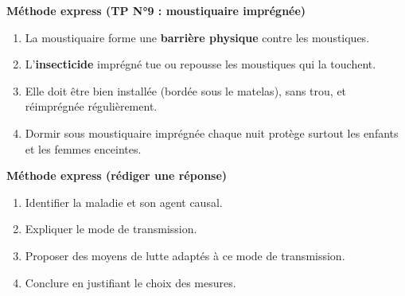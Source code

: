 \documentclass[11pt]{article}
\begin{document}
\begin{bilan}
\textbf{Méthode express (TP N°9 : moustiquaire imprégnée)}
\begin{enumerate}
  \item La moustiquaire forme une \textbf{barrière physique} contre les moustiques.
  \item L'\textbf{insecticide} imprégné tue ou repousse les moustiques qui la touchent.
  \item Elle doit être bien installée (bordée sous le matelas), sans trou, et réimprégnée régulièrement.
  \item Dormir sous moustiquaire imprégnée chaque nuit protège surtout les enfants et les femmes enceintes.
\end{enumerate}

\textbf{Méthode express (rédiger une réponse)}
\begin{enumerate}
  \item Identifier la maladie et son agent causal.
  \item Expliquer le mode de transmission.
  \item Proposer des moyens de lutte adaptés à ce mode de transmission.
  \item Conclure en justifiant le choix des mesures.
\end{enumerate}
\end{bilan}
\end{document}

